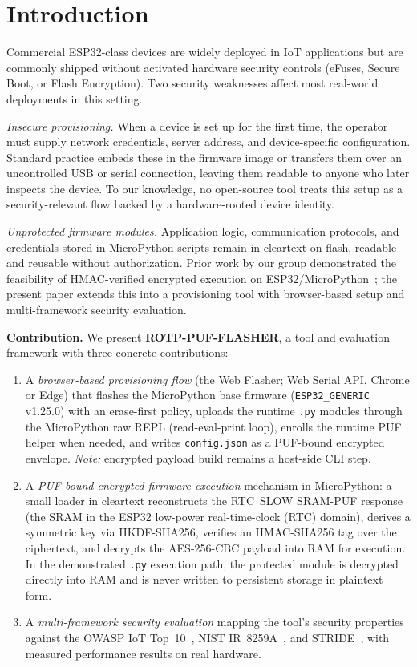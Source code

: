\documentclass[runningheads]{llncs}
\begin{document}
\section{Introduction}


Commercial ESP32-class devices are widely deployed in IoT applications but are commonly shipped without activated hardware security controls (eFuses, Secure Boot, or Flash Encryption). Two security weaknesses affect most real-world deployments in this setting.

\emph{Insecure provisioning.}
When a device is set up for the first time, the operator must supply network credentials, server address, and device-specific configuration. Standard practice embeds these in the firmware image or transfers them over an uncontrolled USB or serial connection, leaving them readable to anyone who later inspects the device. To our knowledge, no open-source tool treats this setup as a security-relevant flow backed by a hardware-rooted device identity.

\emph{Unprotected firmware modules.}
Application logic, communication protocols, and credentials stored in MicroPython scripts remain in cleartext on flash, readable and reusable without authorization. Prior work by our group demonstrated the feasibility of HMAC-verified encrypted execution on ESP32/MicroPython~\cite{salinas2026ejecucion}; the present paper extends this into a provisioning tool with browser-based setup and multi-framework security evaluation.

\medskip
\noindent\textbf{Contribution.} We present \textbf{ROTP-PUF-FLASHER}, a tool and evaluation framework with three concrete contributions:

\begin{enumerate}
\item A \emph{browser-based provisioning flow} (the Web Flasher; Web Serial API, Chrome or Edge) that flashes the MicroPython base firmware (\texttt{ESP32\_GENERIC} v1.25.0) with an erase-first policy, uploads the runtime \texttt{.py} modules through the MicroPython raw REPL (read-eval-print loop), enrolls the runtime PUF helper when needed, and writes \texttt{config.json} as a PUF-bound encrypted envelope. \emph{Note:} encrypted payload build remains a host-side CLI step.


\item A \emph{PUF-bound encrypted firmware execution} mechanism in MicroPython: a small loader in cleartext reconstructs the RTC~SLOW SRAM-PUF response (the SRAM in the ESP32 low-power real-time-clock (RTC) domain), derives a symmetric key via HKDF-SHA256, verifies an HMAC-SHA256 tag over the ciphertext, and decrypts the AES-256-CBC payload into RAM for execution. In the demonstrated \texttt{.py} execution path, the protected module is decrypted directly into RAM and is never written to persistent storage in plaintext form.

\item A \emph{multi-framework security evaluation} mapping the tool's security properties against the OWASP IoT Top~10~\cite{owasp2018iot}, NIST IR~8259A~\cite{nist8259a}, and STRIDE~\cite{shostack2014threat}, with measured performance results on real hardware.
\end{enumerate}
\end{document}
